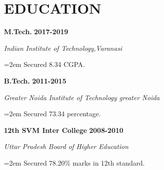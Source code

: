 \documentclass[paper=a4,fontsize=11pt]{scrartcl} %
\newcommand{\sepspace}{\vspace*{1em}}		%
\newcommand{\NewPart}[1]{\section*{\uppercase{#1}}}
\newcommand{\EducationEntry}[4]{
		\noindent \textbf{#1} \hfill      %
		\textbf{#2} \par  %
		\noindent \textit{#3} \par        %
		\noindent\hangindent=2em\hangafter=0 \small #4 %
		\normalsize \par}
\begin{document}
\NewPart{Education}{}
            \EducationEntry
                {M.Tech.}
                {2017-2019}
                {Indian Institute of Technology,Varanasi}
                {Secured 8.34  CGPA.}
             \sepspace
        \EducationEntry
                {B.Tech.}
                {2011-2015}
                {Greater Noida Institute of Technology greater Noida}
                {Secured 73.34 percentage.}
            \sepspace
        \EducationEntry
                {12th SVM Inter College}
                {2008-2010}
                {Uttar Pradesh Board of Higher Education}
                {Secured 78.20\% marks in 12th standard.}
\end{document}
